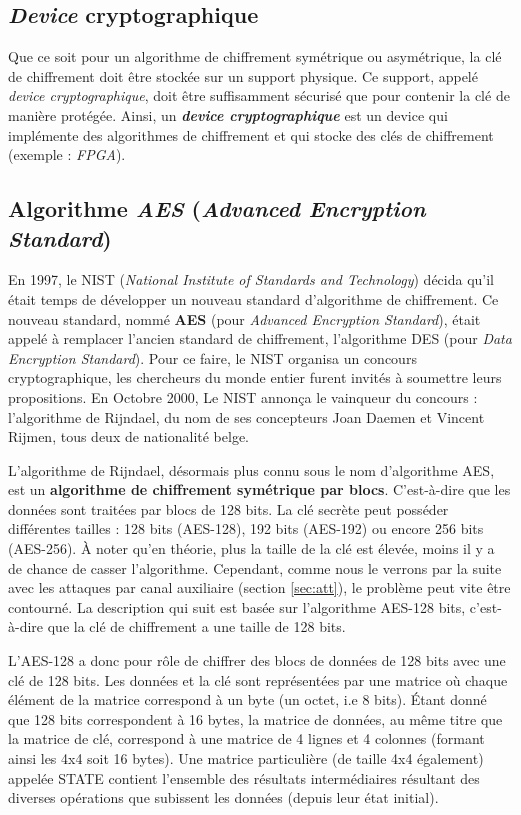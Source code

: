\documentclass[oneside]{book}
\begin{document}
\subsection{\textit{Device} cryptographique}
\label{sec:Introduction}

Que ce soit pour un algorithme de chiffrement symétrique ou asymétrique, la clé de chiffrement doit être stockée sur un support physique. Ce support, appelé \textit{device cryptographique}, doit être suffisamment sécurisé que pour contenir la clé de manière protégée. Ainsi, un \textbf{\textit{device cryptographique}} est un device qui implémente des algorithmes de chiffrement et qui stocke des clés de chiffrement (exemple : \textit{FPGA}).

\subsection{Algorithme \textit{AES} (\textit{Advanced Encryption Standard})}
\label{subsec:AES}

En 1997, le NIST (\textit{National Institute of Standards and Technology}) décida qu'il était temps de développer un nouveau standard d'algorithme de chiffrement. Ce nouveau standard, nommé \textbf{AES} (pour \textit{Advanced Encryption Standard}), était appelé à remplacer l'ancien standard de chiffrement, l'algorithme DES (pour \textit{Data Encryption Standard}). Pour ce faire, le NIST organisa un concours cryptographique, les chercheurs du monde entier furent invités à soumettre leurs propositions. En Octobre 2000, Le NIST annonça le vainqueur du concours : l'algorithme de Rijndael, du nom de ses concepteurs Joan Daemen et Vincent Rijmen, tous deux de nationalité belge.

L'algorithme de Rijndael, désormais plus connu sous le nom d'algorithme AES, est un \textbf{algorithme de chiffrement symétrique par blocs}. C'est-à-dire que les données sont traitées par blocs de 128 bits. La clé secrète peut posséder différentes tailles : 128 bits (AES-128), 192 bits (AES-192) ou encore 256 bits (AES-256). À noter qu'en théorie, plus la taille de la clé est élevée, moins il y a de chance de casser l'algorithme. Cependant, comme nous le verrons par la suite avec les attaques par canal auxiliaire (section \ref{sec:att}), le problème peut vite être contourné. La description qui suit est basée sur l'algorithme AES-128 bits, c'est-à-dire que la clé de chiffrement a une taille de 128 bits.

L'AES-128 a donc pour rôle de chiffrer des blocs de données de 128 bits avec une clé de 128 bits. Les données et la clé sont représentées par une matrice où chaque élément de la matrice correspond à un byte (un octet, i.e 8 bits). Étant donné que 128 bits correspondent à 16 bytes, la matrice de données, au même titre que la matrice de clé, correspond à une matrice de 4 lignes et 4 colonnes (formant ainsi les 4x4 soit 16 bytes). Une matrice particulière (de taille 4x4 également) appelée STATE contient l'ensemble des résultats intermédiaires résultant des diverses opérations que subissent les données (depuis leur état initial). 
\end{document}
